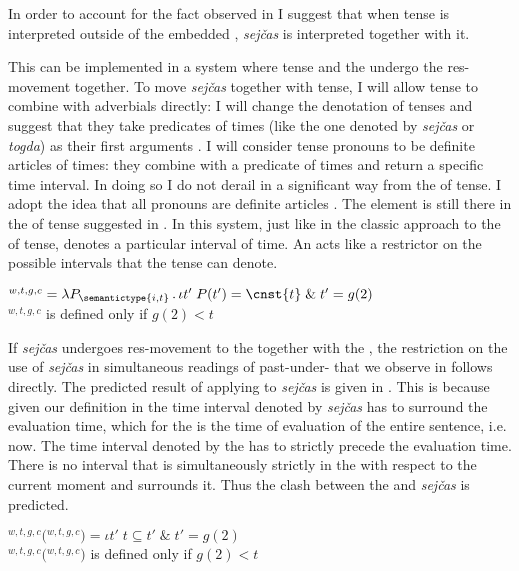 \documentclass[output=paper,modfonts,newtxmath,hidelinks]{langscibook}
\begin{document}
In order to account for the fact observed in  I suggest that when tense is interpreted outside of the embedded , \textit{sejčas} is interpreted together with it.

This can be implemented in a system where tense and the  undergo the res-movement together. To move \textit{sejčas} together with tense, I will allow tense to combine with adverbials directly: I will change the denotation of tenses and suggest that they take predicates of times (like the one denoted by \textit{sejčas} or \textit{togda}) as their first arguments . I will consider tense pronouns to be definite articles of times: they combine with a predicate of times and return a specific time interval. In doing so I do not derail in a significant way from the   of tense. I adopt the idea that all pronouns are definite articles \citep{Elbourne2005}. The  element is still there in the  of tense suggested in . In this system, just like in the classic  approach to the  of tense,  denotes a particular interval of time. An  acts like a restrictor on the possible intervals that the tense can denote.

\ea {}$^{w,t,g,c} =\lambda P_{\semantictype{i,t}}\,.\,\iota t'\;P(t')=\cnst{t}\;\&\;t' = g(2)$\smallskip\\
$^{w,t,g,c}$ is defined only if $g(2)<t$\label{20:ex50}
\z

\noindent If \textit{sejčas} undergoes res-movement to the  together with the , the restriction on the use of \textit{sejčas} in simultaneous readings of past-under- that we observe in  follows directly. The predicted result of applying  to \textit{sejčas} is given in . This is because given our definition in  the time interval denoted by \textit{sejčas} has to surround the evaluation time, which for the  is the time of evaluation of the entire sentence, i.e. now. The time interval denoted by the  has to strictly precede the evaluation time. There is no interval that is simultaneously strictly in the  with respect to the current moment and surrounds it. Thus the clash between the  and \textit{sejčas} is predicted.

\ea {}$^{w,t,g,c}($$^{w,t,g,c}) = \iota t'\; t\subseteq t'\;\&\; t' = g(2)$\smallskip\\
$^{w,t,g,c}($$^{w,t,g,c})$ is defined only if $g(2)<t$\label{20:ex51}
\z
\end{document}
